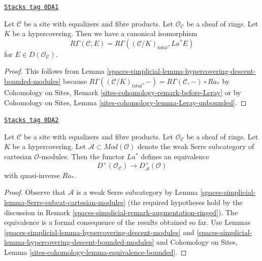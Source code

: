 \begin{lemma}
\label{spaces-simplicial-lemma-compare-cohomology-hypercovering-modules}
\href{https://stacks.math.columbia.edu/tag/0DA1}{\texttt{Stacks tag 0DA1}}

Let $\mathcal{C}$ be a site with equalizers and fibre products.
Let $\mathcal{O}_\mathcal{C}$ be a sheaf of rings.
Let $K$ be a hypercovering.
Then we have a canonical isomorphism
$$
R\Gamma(\mathcal{C}, E) =
R\Gamma((\mathcal{C}/K)_{total}, La^*E)
$$
for $E \in D(\mathcal{O}_\mathcal{C})$.
\end{lemma}

\begin{proof}
This follows from Lemma \ref{spaces-simplicial-lemma-hypercovering-descent-bounded-modules}
because $R\Gamma((\mathcal{C}/K)_{total}, -) =
R\Gamma(\mathcal{C}, -) \circ Ra_*$ by
Cohomology on Sites, Remark \ref{sites-cohomology-remark-before-Leray}
or by
Cohomology on Sites, Lemma \ref{sites-cohomology-lemma-Leray-unbounded}.
\end{proof}

\begin{lemma}
\label{spaces-simplicial-lemma-hypercovering-equivalence-bounded-modules}
\href{https://stacks.math.columbia.edu/tag/0DA2}{\texttt{Stacks tag 0DA2}}

Let $\mathcal{C}$ be a site with equalizers and fibre products.
Let $\mathcal{O}_\mathcal{C}$ be a sheaf of rings.
Let $K$ be a hypercovering.
Let $\mathcal{A} \subset \textit{Mod}(\mathcal{O})$
denote the weak Serre subcategory of cartesian $\mathcal{O}$-modules.
Then the functor $La^*$ defines an equivalence
$$
D^+(\mathcal{O}_\mathcal{C}) \longrightarrow D_\mathcal{A}^+(\mathcal{O})
$$
with quasi-inverse $Ra_*$.
\end{lemma}

\begin{proof}
Observe that $\mathcal{A}$ is a weak Serre subcategory by
Lemma \ref{spaces-simplicial-lemma-Serre-subcat-cartesian-modules}
(the required hypotheses hold by the discussion in
Remark \ref{spaces-simplicial-remark-augmentation-ringed}).
The equivalence is a
formal consequence of the results obtained so far. Use
Lemmas \ref{spaces-simplicial-lemma-hypercovering-descent-modules} and
\ref{spaces-simplicial-lemma-hypercovering-descent-bounded-modules} and
Cohomology on Sites, Lemma \ref{sites-cohomology-lemma-equivalence-bounded}.
\end{proof}

